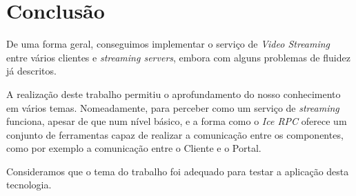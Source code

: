 \documentclass{article}
\begin{document}
\section{Conclusão}

De uma forma geral, conseguimos implementar o serviço de \textit{Video Streaming} entre vários clientes e \textit{streaming servers}, embora com alguns problemas de fluidez já descritos.

A realização deste trabalho permitiu o aprofundamento do nosso conhecimento em vários temas. Nomeadamente, para perceber como um serviço de \textit{streaming} funciona, apesar de que num nível básico, e a forma como o \textit{Ice RPC} oferece  um conjunto de ferramentas capaz de realizar a comunicação entre os componentes, como por exemplo a comunicação entre o Cliente e o Portal.

Consideramos que o tema do trabalho foi adequado para testar a aplicação desta tecnologia.
\end{document}
